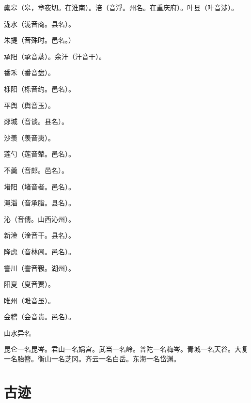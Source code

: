 \documentclass[a4paper,12pt,UTF8,twoside]{ctexbook}
\begin{document}
	橐皋（皋，章夜切。在淮南）。涪（音浮。州名。在重庆府）。叶县（叶音涉）。
	
	泷水（泷音商。县名）。
	
	朱提（音殊时。邑名。）
	
	承阳（承音蒸）。余汗（汗音干）。
	
	番禾（番音盘）。
	
	栎阳（栎音约。邑名）。
	
	平舆（舆音玉）。
	
	郯城（音谈。县名）。
	
	沙羡（羡音夷）。
	
	莲勺（莲音辇。邑名）。
	
	不羹（音郎。邑名）。
	
	堵阳（堵音者。邑名）。
	
	渑淄（音承脂。县名）。
	
	沁（音倩。山西沁州）。
	
	新淦（淦音干。县名）。
	
	隆虑（音林闾。邑名）。
	
	霅川（霅音靸。湖州）。
	
	阳夏（夏音贾）。
	
	睢州（睢音虽）。
	
	会稽（会音贵。邑名）。
	
	山水异名
	
	昆仑一名昆岑。君山一名娲宫。武当一名岭。普陀一名梅岑。青城一名天谷。大复一名胎簪。衡山一名芝冈。齐云一名白岳。东海一名岱渊。
	
	
	
	\chapter{古迹}
	
\end{document}
